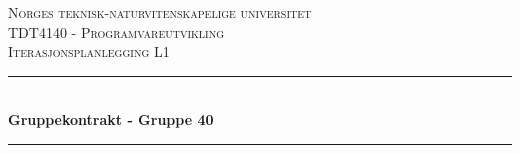 \documentclass[11pt]{article}
\begin{document}
	
	\begin{titlepage}
		
		\newcommand{\HRule}{\rule{\linewidth}{0.8mm}} 
		
		\centering
		
		
		\textsc{\LARGE Norges teknisk-naturvitenskapelige universitet}\\[1.5cm] %
		\textsc{\Large TDT4140 - Programvareutvikling}\\[0.5cm] %
		\textsc{\large Iterasjonsplanlegging L1}\\[0.5cm] %
		
		
		\HRule \\[0.4cm]
		{ \huge \bfseries Gruppekontrakt - Gruppe 40}\\[0.4cm] %
		\HRule \\[1.5cm]
		
		
		

\end{titlepage}
\end{document}
